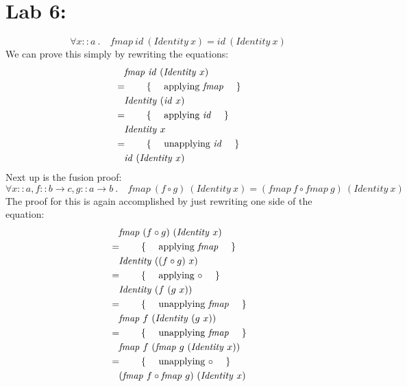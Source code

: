 \pagebreak \section{Lab 6: \practicalSixTitle}

\begin{displaymath}
\forall x :: \mathit{a}~. \quad \mathit{fmap}~\mathit{id}~(\mathit{Identity}~x) = \mathit{id}~(\mathit{Identity}~x)
\end{displaymath}
We can prove this simply by rewriting the equations:
\begin{align*}
&\quad \mathit{fmap}~\mathit{id}~(\mathit{Identity}~x)\\
&=\qquad\text{\{\quad\ applying $\mathit{fmap}$ \quad\}}\\
&\quad \mathit{Identity}~(\mathit{id}~x)\\
&=\qquad\text{\{\quad\ applying $\mathit{id}$ \quad\}}\\
&\quad \mathit{Identity}~x\\
&=\qquad\text{\{\quad\ unapplying $\mathit{id}$ \quad\}}\\
&\quad \mathit{id}~(\mathit{Identity}~x)
\end{align*}
Next up is the fusion proof:
\begin{displaymath}
\forall x :: \mathit{a}, f :: b \to c, g :: a \to b~. \quad \mathit{fmap}~(f \circ g)~(\mathit{Identity}~x) = (\mathit{fmap}~f \circ \mathit{fmap}~g)~(\mathit{Identity}~x)
\end{displaymath}
The proof for this is again accomplished by just rewriting one side of the equation:
\begin{align*}
&\quad \mathit{fmap}~(f \circ g)~(\mathit{Identity}~x)\\
&=\qquad\text{\{\quad\ applying $\mathit{fmap}$ \quad\}}\\
&\quad \mathit{Identity}~((f \circ g)~x)\\
&=\qquad\text{\{\quad\ applying $\circ$ \quad\}}\\
&\quad \mathit{Identity}~(f~(g~x))\\
&=\qquad\text{\{\quad\ unapplying $\mathit{fmap}$ \quad\}}\\
&\quad \mathit{fmap}~f~(\mathit{Identity}~(g~x))\\
&=\qquad\text{\{\quad\ unapplying $\mathit{fmap}$ \quad\}}\\
&\quad \mathit{fmap}~f~(\mathit{fmap}~g~(\mathit{Identity}~x))\\
&=\qquad\text{\{\quad\ unapplying $\circ$ \quad\}}\\
&\quad (\mathit{fmap}~f \circ \mathit{fmap}~g)~(\mathit{Identity}~x)
\end{align*}


